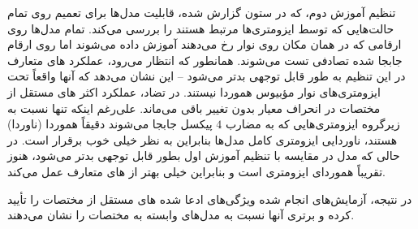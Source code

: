 تنظیم آموزش دوم، که در ستون  گزارش شده، قابلیت مدل‌ها برای تعمیم روی تمام حالت‌هایی که توسط ایزومتری‌ها مرتبط هستند را بررسی می‌کند.
تمام مدل‌ها روی ارقامی که در همان مکان روی نوار رخ می‌دهند آموزش داده می‌شوند اما روی ارقام جابجا شده تصادفی تست می‌شوند.
همانطور که انتظار می‌رود، عملکرد های متعارف در این تنظیم به طور قابل توجهی بدتر می‌شود -- این نشان می‌دهد که آنها واقعاً تحت ایزومتری‌های نوار مؤبیوس هموردا نیستند.
در تضاد، عملکرد اکثر های مستقل از مختصات در انحراف معیار بدون تغییر باقی می‌ماند.
علی‌رغم اینکه تنها نسبت به زیرگروه ایزومتری‌هایی که به مضارب $4$ پیکسل جابجا می‌شوند دقیقاً هموردا (ناوردا) هستند، ناوردایی ایزومتری کامل مدل‌ها بنابراین به نظر خیلی خوب برقرار است.
در حالی که مدل  در مقایسه با تنظیم آموزش اول بطور قابل توجهی بدتر می‌شود، هنوز تقریباً هموردای ایزومتری است و بنابراین خیلی بهتر از های متعارف عمل می‌کند.

در نتیجه، آزمایش‌های انجام شده ویژگی‌های ادعا شده های مستقل از مختصات را تأیید کرده و برتری آنها نسبت به مدل‌های وابسته به مختصات را نشان می‌دهند.